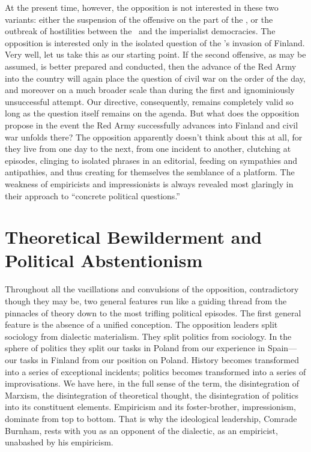 At the present time, however, the opposition is not interested in these two variants: either the suspension of the offensive on the part of the \USSR, or the outbreak of hostilities between the \USSR\ and the imperialist democracies. The opposition is interested only in the isolated question of the \USSR’s invasion of Finland. Very well, let us take this as our starting point. If the second offensive, as may be assumed, is better prepared and conducted, then the advance of the Red Army into the country will again place the question of civil war on the order of the day, and moreover on a much broader scale than during the first and ignominiously unsuccessful attempt. Our directive, consequently, remains completely valid so long as the question itself remains on the agenda. But what does the opposition propose in the event the Red Army successfully advances into Finland and civil war unfolds there? The opposition apparently doesn’t think about this at all, for they live from one day to the next, from one incident to another, clutching at episodes, clinging to isolated phrases in an editorial, feeding on sympathies and antipathies, and thus creating for themselves the semblance of a platform. The weakness of empiricists and impressionists is always revealed most glaringly in their approach to “concrete political questions.”
\noclub

\section*{Theoretical Bewilderment and Political Abstentionism}

Throughout all the vacillations and convulsions of the opposition, contradictory though they may be, two general features run like a guiding thread from the pinnacles of theory down to the most trifling political episodes. The first general feature is the absence of a unified conception. The opposition leaders split sociology from dialectic materialism. They split politics from sociology. In the sphere of politics they split our tasks in Poland from our experience in Spain---our tasks in Finland from our position on Poland. History becomes transformed into a series of exceptional incidents; politics becomes transformed into a series of improvisations. We have here, in the full sense of the term, the disintegration of Marxism, the disintegration of theoretical thought, the disintegration of politics into its constituent elements. Empiricism and its foster-brother, impressionism, dominate from top to bottom. That is why the ideological leadership, Comrade Burnham, rests with you as an opponent of the dialectic, as an empiricist, unabashed by his empiricism.

